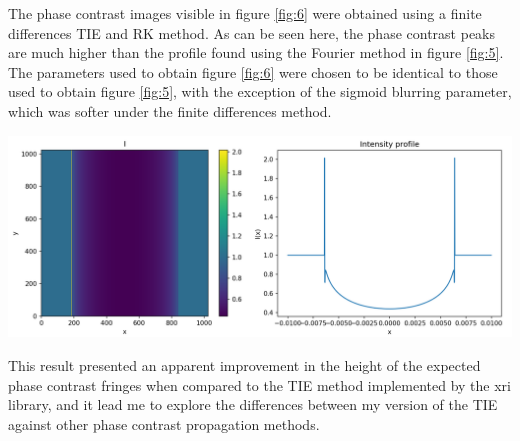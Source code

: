 \documentclass[10pt, a4paper, singlespacing]{report}
\newenvironment{Figure}
    {\par\medskip\noindent\minipage{\linewidth}}
    {\endminipage\par\medskip}
\begin{document}
The phase contrast images visible in figure \ref{fig:6} were obtained using a finite differences TIE and RK method. As can be seen here, the phase contrast peaks are much higher than the profile found using the Fourier method in figure \ref{fig:5}. The parameters used to obtain figure \ref{fig:6} were chosen to be identical to those used to obtain figure \ref{fig:5}, with the exception of the sigmoid blurring parameter, which was softer under the finite differences method.
\begin{Figure}\label{fig:6}  
\centering
\includegraphics[width=\linewidth]{FD_intensity_profile.pdf}
\end{Figure}
This result presented an apparent improvement in the height of the expected phase contrast fringes when compared to the TIE method implemented by the xri library, and it lead me to explore the differences between my version of the TIE against other phase contrast propagation methods.
\end{document}
